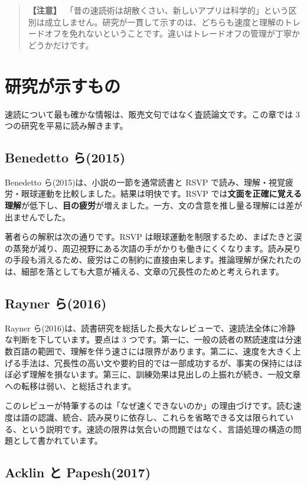 \documentclass{article}
\begin{document}
\begin{quote}
\textbf{【注意】}\ 「昔の速読術は胡散くさい、新しいアプリは科学的」という区別は成立しません。研究が一貫して示すのは、どちらも速度と理解のトレードオフを免れないということです。違いはトレードオフの管理が丁寧かどうかだけです。
\end{quote}

\section{研究が示すもの}

速読について最も確かな情報は、販売文句ではなく査読論文です。この章では 3 つの研究を平易に読み解きます。

\subsection{Benedetto ら(2015)}

Benedetto ら(2015)は、小説の一節を通常読書と RSVP で読み、理解・視覚疲労・眼球運動を比較しました。結果は明快です。RSVP では\textbf{文面を正確に覚える理解}が低下し、\textbf{目の疲労}が増えました。一方、文の含意を推し量る理解には差が出ませんでした。

著者らの解釈は次の通りです。RSVP は眼球運動を制限するため、まばたきと涙の蒸発が減り、周辺視野にある次語の手がかりも働きにくくなります。読み戻りの手段も消えるため、疲労はこの制約に直接由来します。推論理解が保たれたのは、細部を落としても大意が補える、文章の冗長性のためと考えられます。

\subsection{Rayner ら(2016)}

Rayner ら(2016)は、読書研究を総括した長大なレビューで、速読法全体に冷静な判断を下しています。要点は 3 つです。第一に、一般の読者の黙読速度は分速数百語の範囲で、理解を伴う速さには限界があります。第二に、速度を大きく上げる手法は、冗長性の高い文や要約目的では一部成功するが、事実の保持にはほぼ必ず理解を損ないます。第三に、訓練効果は見出しの上振れが続き、一般文章への転移は弱い、と総括されます。

このレビューが特筆するのは「なぜ速くできないのか」の理由づけです。読む速度は語の認識、統合、読み戻りに依存し、これらを省略できる文は限られている、という説明です。速読の限界は気合いの問題ではなく、言語処理の構造の問題として書かれています。

\subsection{Acklin と Papesh(2017)}
\end{document}

